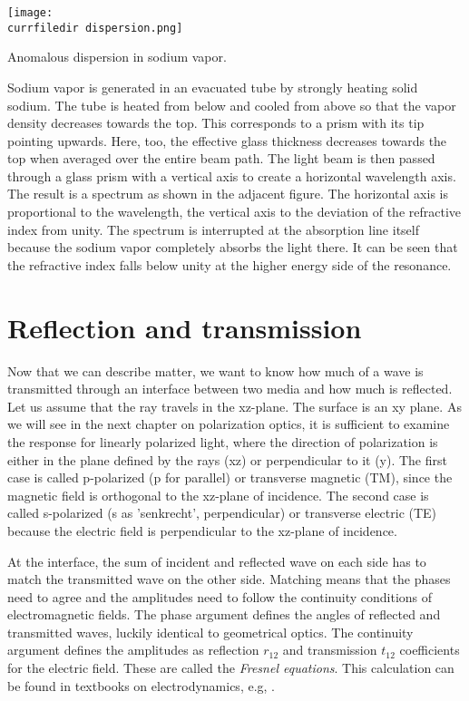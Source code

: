 \begin{marginfigure}
\texttt{[image: \\currfiledir dispersion.png]}
\caption{Anomalous dispersion in sodium vapor. }
\end{marginfigure}


Sodium vapor is generated in an evacuated tube by strongly heating solid sodium.  The tube is heated from below and cooled from above so that the vapor density decreases towards the top. This corresponds to a prism with its tip pointing upwards. Here, too, the effective glass thickness decreases towards the top when averaged over the entire beam path. The light beam is then passed through a glass prism with a vertical axis to create a horizontal wavelength axis. The result is a spectrum as shown in the adjacent figure. The horizontal axis is proportional to the wavelength, the vertical axis to the deviation of the refractive index from unity. The spectrum is interrupted at the absorption line itself because the sodium vapor completely absorbs the light there. It can be seen that the refractive index falls below unity at the higher energy side of the resonance.


\section{Reflection and transmission}

Now that we can describe matter, we want to know how much of a wave is transmitted through an interface between two media and how much is reflected. Let us assume that the ray travels in the xz-plane. The surface is an xy plane. As we will see in the next chapter on polarization optics, it is sufficient to examine the response for linearly polarized light, where the direction of polarization is either in the plane defined by the rays (xz) or perpendicular to it (y). The first case is called p-polarized (p for parallel) or transverse magnetic (TM), since the magnetic field is orthogonal to the xz-plane of incidence. The second case is called s-polarized (s as 'senkrecht', perpendicular) or transverse electric (TE) because the electric field is perpendicular to the xz-plane of incidence.

At the interface, the sum of incident and reflected wave on each side has to match the transmitted wave on the other side. Matching means that the phases need to agree and the amplitudes need to follow the continuity conditions of electromagnetic fields. The phase argument defines the angles of reflected and transmitted waves, luckily identical to geometrical optics. The continuity argument defines the amplitudes as reflection $r_{12}$ and transmission $t_{12}$ coefficients for the electric field. These are called the \emph{Fresnel equations}. This calculation can be found in textbooks on electrodynamics, e.g, \cite{Nolting-ED}.



